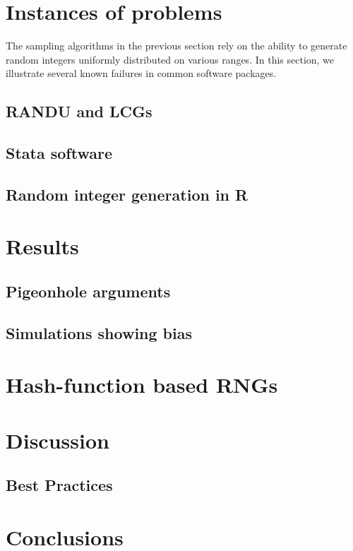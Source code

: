 \documentclass[12pt]{article}
\begin{document}
\section{Instances of problems}
The sampling algorithms in the previous section rely on the ability to generate random integers uniformly distributed 
on various ranges.
In this section, we illustrate several known failures in common software packages.
 

\subsection{RANDU and LCGs}

\subsection{Stata software}
\subsection{Random integer generation in R}

\section{Results}
\subsection{Pigeonhole arguments}
\subsection{Simulations showing bias}
\section{Hash-function based RNGs}
\section{Discussion}
\subsection{Best Practices}
\section{Conclusions}
\end{document}
